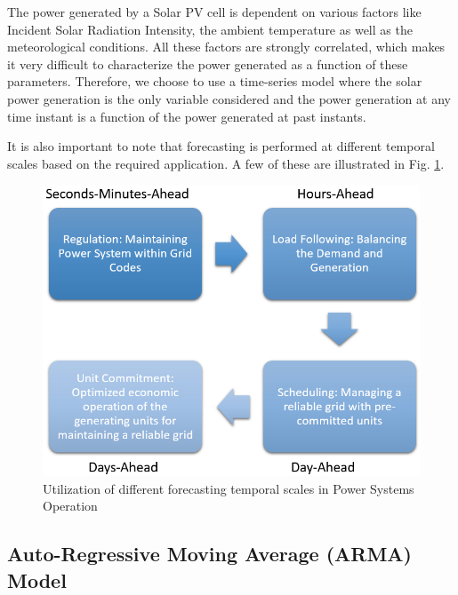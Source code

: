 \documentclass[journal]{IEEEtran}
\begin{document}
The power generated by a Solar PV cell is dependent on various factors like Incident Solar Radiation Intensity, the ambient temperature as well as the meteorological conditions. All these factors are strongly correlated, which makes it very difficult to characterize the power generated as a function of these parameters. \cite{zhou2007novel} Therefore, we choose to use a time-series model where the solar power generation is the only variable considered and the power generation at any time instant is a function of the power generated at past instants. \cite{huang2012solar}

It is also important to note that forecasting is performed at different temporal scales based on the required application. A few of these are illustrated in Fig. \ref{fig18}.

\begin{figure}[htpb]
	\centering
	\includegraphics[scale=0.5]{NeedForecasting.png}
	\caption{Utilization of different forecasting temporal scales in Power Systems Operation}
	\label{fig18} %
\end{figure}

\subsection{Auto-Regressive Moving Average (ARMA) Model}
\end{document}
